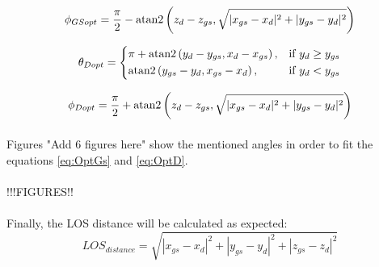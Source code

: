 \begin{equation*}
  \phi_{GSopt}= 
  \dfrac{\pi}{2} - {\rm atan2}\left(z_{d}-z_{gs}, \sqrt{|x_{gs}-x_{d}|^{2}+|y_{gs}-y_{d}|^{2}}\right)
  \label{eq:OptGS}
\end{equation*}

\begin{equation}
  \theta_{Dopt}=
  \begin{dcases}
    \pi + {\rm atan2}\left(y_{d}-y_{gs}, x_{d}-x_{gs}\right), & \text{if } y_{d} \geq y_{gs}\\
    {\rm atan2}\left(y_{gs}-y_{d}, x_{gs}-x_{d}\right), & \text{if } y_{d} < y_{gs}
  \end{dcases}
\end{equation}

\begin{equation*}
  \phi_{Dopt}= 
  \dfrac{\pi}{2} + {\rm atan2}\left(z_{d}-z_{gs}, \sqrt{|x_{gs}-x_{d}|^{2}+|y_{gs}-y_{d}|^{2}}\right)
  \label{eq:OptD}
\end{equation*}

\paragraph{} Figures "Add 6 figures here" show the mentioned angles in order to fit the equations \ref{eq:OptGs} and \ref{eq:OptD}.

\paragraph{} !!!FIGURES!!
\begin{figure}[H]
   \centering
     
    \label{fig:OptimalAngles1}  
\end{figure}

\paragraph{} Finally, the LOS distance will be calculated as expected:
\begin{equation*}
  LOS_{distance}= 
  \sqrt{|x_{gs}-x_{d}|^{2}+|y_{gs}-y_{d}|^{2}+|z_{gs}-z_{d}|^{2}}
  \label{eq:OptD}
\end{equation*}

